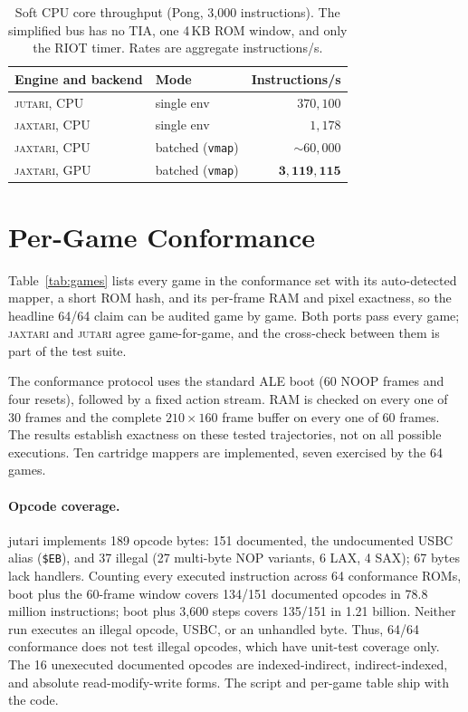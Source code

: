 \documentclass[letterpaper]{article} %
\begin{document}
\begin{table}[tb]
\centering
\caption{Soft CPU core throughput (Pong,
3,000 instructions). The simplified bus has
no TIA, one 4\,KB ROM window, and only the
RIOT timer. Rates are aggregate instructions/s.}
\label{tab:s-compare}
\small
\setlength{\tabcolsep}{6pt}
\begin{tabular}{llr}
\toprule
Engine and backend & Mode & Instructions/s\\
\midrule
\textsc{jutari}, CPU  & single env             & $370{,}100$\\
\textsc{jaxtari}, CPU & single env             & $1{,}178$\\
\textsc{jaxtari}, CPU & batched (\texttt{vmap}) & ${\sim}60{,}000$\\
\textsc{jaxtari}, GPU & batched (\texttt{vmap}) & $\mathbf{3{,}119{,}115}$\\
\bottomrule
\end{tabular}
\end{table}

\section{Per-Game Conformance}

Table~\ref{tab:games} lists every game in the conformance set with its
auto-detected mapper, a short ROM hash, and its per-frame RAM and pixel
exactness, so the headline 64/64 claim can be audited game by game. Both ports
pass every game; \textsc{jaxtari} and \textsc{jutari} agree game-for-game, and
the cross-check between them is part of the test suite.

The conformance protocol uses the standard ALE boot
(60 NOOP frames and four resets), followed by a
fixed action stream. RAM is checked on every one
of 30 frames and the complete $210\times160$
frame buffer on every one of 60 frames.
The results establish exactness on these tested
trajectories, not on all possible executions.
Ten cartridge mappers are implemented, seven
exercised by the 64 games.

\paragraph{Opcode coverage.}
jutari implements 189 opcode bytes:
151 documented, the undocumented USBC alias (\texttt{\$EB}),
and 37 illegal (27 multi-byte NOP variants, 6 LAX, 4 SAX);
67 bytes lack handlers. Counting every executed instruction
across 64 conformance ROMs,
boot plus the 60-frame window covers 134/151 documented opcodes
in 78.8 million instructions; boot plus 3,600 steps covers
135/151 in 1.21 billion. Neither run executes an illegal
opcode, USBC, or an unhandled byte. Thus, 64/64 conformance
does not test illegal opcodes, which have unit-test coverage only.
The 16 unexecuted documented opcodes are indexed-indirect,
indirect-indexed, and absolute read-modify-write forms.
The script and per-game table ship with the code.
\end{document}
